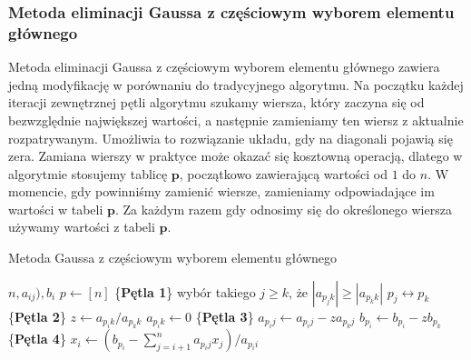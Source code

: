\documentclass[12pt]{article}
\begin{document}
\subsubsection*{Metoda eliminacji Gaussa z częściowym wyborem elementu głównego}
Metoda eliminacji Gaussa z częściowym wyborem elementu głównego zawiera jedną modyfikację w porównaniu do tradycyjnego algorytmu. Na początku każdej iteracji zewnętrznej pętli algorytmu szukamy wiersza, który zaczyna się od bezwzględnie największej wartości, a następnie zamieniamy ten wiersz z aktualnie rozpatrywanym. Umożliwia to rozwiązanie układu, gdy na diagonali pojawią się zera. Zamiana wierszy w praktyce może okazać się kosztowną operacją, dlatego w algorytmie stosujemy tablicę $\textbf{p}$, początkowo zawierającą wartości od $1$ do $n$. W momencie, gdy powinniśmy zamienić wiersze, zamieniamy odpowiadające im wartości w tabeli $\textbf{p}$. Za każdym razem gdy odnosimy się do określonego wiersza używamy wartości z tabeli $\textbf{p}$.

\begin{algorithm} %
\caption{Metoda Gaussa z częściowym wyborem elementu głównego}
\label{alg2} %
\begin{algorithmic} %
    \REQUIRE $n, a_{ij}), b_i$
    \STATE $p \leftarrow [n]$
    \STATE \{\textbf{Pętla 1}\}
		\STATE wybór takiego $j \geq k$, że $|a_{p_jk}| \geq |a_{p_kk}|$
		\STATE $p_j \leftrightarrow p_k$
    		\STATE \{\textbf{Pętla 2}\}
		\STATE $z \leftarrow a_{p_ik}/a_{p_kk}$
		\STATE $a_{p_ik} \leftarrow 0$
    			\STATE \{\textbf{Pętla 3}\}
				\STATE $a_{p_ij} \leftarrow a_{p_ij} - z a_{p_kj}$
    			\ENDFOR
    			\STATE $b_{p_i} \leftarrow b_{p_i} - z b_{p_k}$
    		\ENDFOR
    \ENDFOR
    \STATE \{\textbf{Pętla 4}\}
		\STATE $x_i \leftarrow (b_{p_i} - \sum^n_{j=i+1}a_{p_ij}x_j)/a_{p_ii}$
    \ENDFOR
\end{algorithmic}
\end{algorithm}
\end{document}
